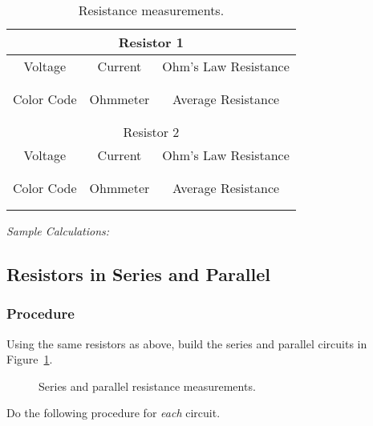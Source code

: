 \begin{table}[htb]
\begin{center}
\begin{tabular}{|c|c|c|}
\hline
\multicolumn{3}{|c|}{Resistor 1} \\
\hline 
Voltage & Current & Ohm's Law Resistance \\ 
\hline
\hspace*{3cm} & \hspace*{3cm} & \hspace*{3cm} \\ 
& &  \\ 
\hline
Color Code & Ohmmeter & Average Resistance \\ 
\hline
& &  \\
& &  \\
\hline
\hline
\multicolumn{3}{|c|}{Resistor 2} \\
\hline 

Voltage & Current & Ohm's Law Resistance \\
\hline
\hspace*{3cm} & \hspace*{3cm} & \hspace*{3cm} \\ 
& &  \\ 
\hline

Color Code & Ohmmeter & Average Resistance \\ 
\hline
& &  \\
& &  \\
\hline
\end{tabular}
\end{center}
\caption{Resistance measurements.}
\label{tab:DC:resistmeas}
\end{table}

{\it Sample Calculations:}
\vspace*{3.5cm}



\newpage

\subsection{Resistors in Series and Parallel}
\subsubsection{Procedure}

Using the same resistors as above, build the series and parallel circuits in
Figure~\ref{fig:DC:procserpar}.  
\begin{figure}[htb]
\centerline{\epsfxsize=14cm }
\caption{Series and parallel resistance measurements.}
\label{fig:DC:procserpar}
\end{figure}
Do the following procedure for {\it each} circuit. 

